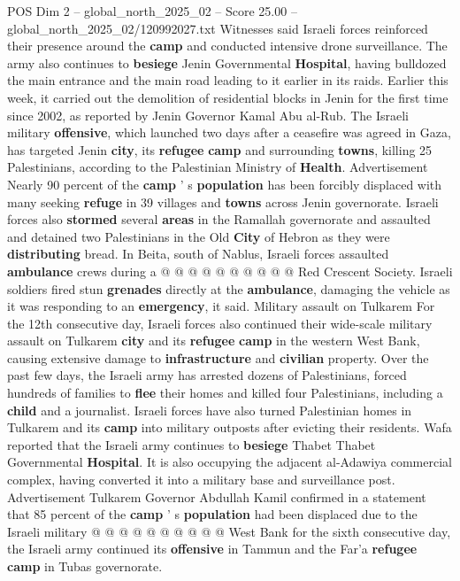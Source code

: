\begin{textsample}{POS Dim 2 – global\_north\_2025\_02 – Score 25.00 – global\_north\_2025\_02/120992027.txt}  \label{ex:f2_pos_432}
Witnesses said Israeli forces reinforced their presence around the \textbf{camp} and conducted intensive drone surveillance.
The army also continues to \textbf{besiege} Jenin Governmental \textbf{Hospital}, having bulldozed the main entrance and the main road leading to it earlier in its raids.
Earlier this week, it carried out the demolition of residential blocks in Jenin for the first time since 2002, as reported by Jenin Governor Kamal Abu al-Rub.
The Israeli military \textbf{offensive}, which launched two days after a ceasefire was agreed in Gaza, has targeted Jenin \textbf{city}, its \textbf{refugee} \textbf{camp} and surrounding \textbf{towns}, killing 25 Palestinians, according to the Palestinian Ministry of \textbf{Health}.
Advertisement Nearly 90 percent of the \textbf{camp} ' s \textbf{population} has been forcibly displaced with many seeking \textbf{refuge} in 39 villages and \textbf{towns} across Jenin governorate.
Israeli forces also \textbf{stormed} several \textbf{areas} in the Ramallah governorate and assaulted and detained two Palestinians in the Old \textbf{City} of Hebron as they were \textbf{distributing} bread.
In Beita, south of Nablus, Israeli forces assaulted \textbf{ambulance} crews during a @ @ @ @ @ @ @ @ @ @ Red Crescent Society.
Israeli soldiers fired stun \textbf{grenades} directly at the \textbf{ambulance}, damaging the vehicle as it was responding to an \textbf{emergency}, it said.
Military assault on Tulkarem For the 12th consecutive day, Israeli forces also continued their wide-scale military assault on Tulkarem \textbf{city} and its \textbf{refugee} \textbf{camp} in the western West Bank, causing extensive damage to \textbf{infrastructure} and \textbf{civilian} property.
Over the past few days, the Israeli army has arrested dozens of Palestinians, forced hundreds of families to \textbf{flee} their homes and killed four Palestinians, including a \textbf{child} and a journalist.
Israeli forces have also turned Palestinian homes in Tulkarem and its \textbf{camp} into military outposts after evicting their residents.
Wafa reported that the Israeli army continues to \textbf{besiege} Thabet Thabet Governmental \textbf{Hospital}.
It is also occupying the adjacent al-Adawiya commercial complex, having converted it into a military base and surveillance post.
Advertisement Tulkarem Governor Abdullah Kamil confirmed in a statement that 85 percent of the \textbf{camp} ' s \textbf{population} had been displaced due to the Israeli military @ @ @ @ @ @ @ @ @ @ West Bank for the sixth consecutive day, the Israeli army continued its \textbf{offensive} in Tammun and the Far'a \textbf{refugee} \textbf{camp} in Tubas governorate.

\end{textsample}

